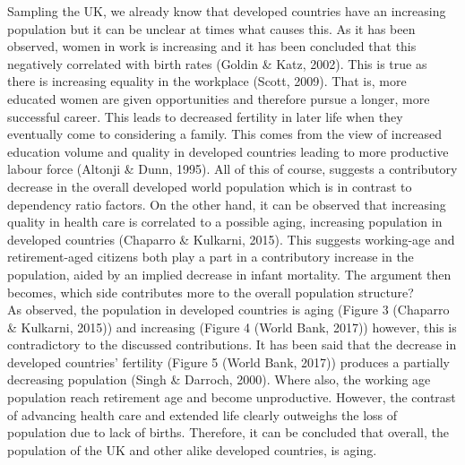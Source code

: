 \documentclass[11pt, english]{article}
\begin{document}
	Sampling the UK, we already know that developed countries have an increasing population but it can be unclear at times what causes this. As it has been observed, women in work is increasing and it has been concluded that this negatively correlated with birth rates (Goldin \& Katz, 2002). This is true as there is increasing equality in the workplace (Scott, 2009). That is, more educated women are given opportunities and therefore pursue a longer, more successful career. This leads to decreased fertility in later life when they eventually come to considering a family. This comes from the view of increased education volume and quality in developed countries leading to more productive labour force (Altonji \& Dunn, 1995). All of this of course, suggests a contributory decrease in the overall developed world population which is in contrast to dependency ratio factors. On the other hand, it can be observed that increasing quality in health care is correlated to a possible aging, increasing population in developed countries (Chaparro \& Kulkarni, 2015). This suggests working-age and retirement-aged citizens both play a part in a contributory increase in the population, aided by an implied decrease in infant mortality. The argument then becomes, which side contributes more to the overall population structure?\\

	As observed, the population in developed countries is aging (Figure 3 (Chaparro \& Kulkarni, 2015)) and increasing (Figure 4 (World Bank, 2017)) however, this is contradictory to the discussed contributions. It has been said that the decrease in developed countries' fertility (Figure 5 (World Bank, 2017)) produces a partially decreasing population (Singh \& Darroch, 2000). Where also, the working age population reach retirement age and become unproductive. However, the contrast of advancing health care and extended life clearly outweighs the loss of population due to lack of births.  Therefore, it can be concluded that overall, the population of the UK and other alike developed countries, is aging.\\
\end{document}
